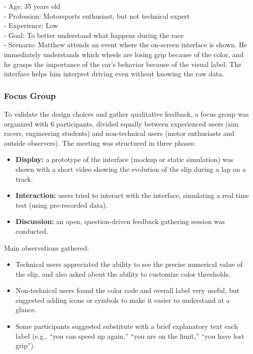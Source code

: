 \documentclass[a4paper,final,12pt]{report}
\begin{document}
\begin{itemize}
    - Age: 35 years old\\
    - Profession: Motorsports enthusiast, but not technical expert\\
    - Experience: Low\\
    - Goal: To better understand what happens during the race\\
    - Scenario: Matthew attends an event where the on-screen interface is shown. He immediately understands which wheels are losing grip because of the color, and he grasps the importance of the car's behavior because of the visual label. The interface helps him interpret driving even without knowing the raw data.
\end{itemize}

\subsubsection{Focus Group}
To validate the design choices and gather qualitative feedback, a focus group was organized with 6 participants, divided equally between experienced users (sim racers, engineering students) and non-technical users (motor enthusiasts and outside observers). The meeting was structured in three phases:

\begin{itemize}
    \item \textbf{Display:} a prototype of the interface (mockup or static simulation) was shown with a short video showing the evolution of the slip during a lap on a track.
    \item \textbf{Interaction:} users tried to interact with the interface, simulating a real time test (using pre-recorded data).
    \item \textbf{Discussion:} an open, question-driven feedback gathering session was conducted.
\end{itemize}
Main observations gathered:
\begin{itemize}
    \item Technical users appreciated the ability to see the precise numerical value of the slip, and also asked about the ability to customize color thresholds.
    \item Non-technical users found the color code and overall label very useful, but suggested adding icons or symbols to make it easier to understand at a glance.
    \item Some participants suggested substitute with a brief explanatory text each label (e.g., “you can speed up again,” “you are on the limit,” “you have lost grip”).
\end{itemize}
\end{document}
